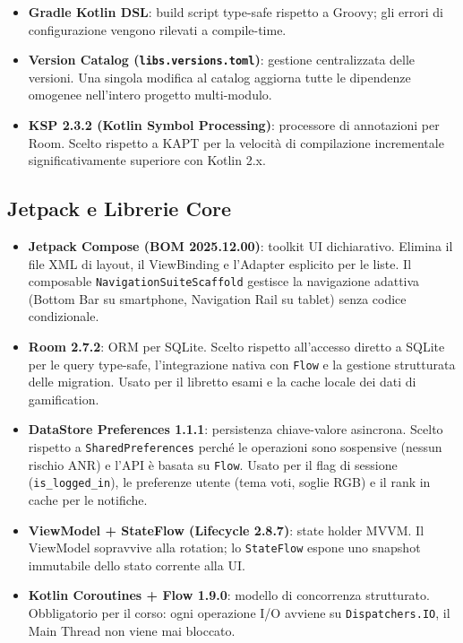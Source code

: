 \documentclass[a4paper,12pt]{report}
\begin{document}
    \begin{itemize}
        \item \textbf{Gradle Kotlin DSL}: build script type-safe rispetto a Groovy;
        gli errori di configurazione vengono rilevati a compile-time.
        \item \textbf{Version Catalog (\texttt{libs.versions.toml})}: gestione
        centralizzata delle versioni. Una singola modifica al catalog aggiorna tutte
        le dipendenze omogenee nell'intero progetto multi-modulo.
        \item \textbf{KSP 2.3.2 (Kotlin Symbol Processing)}: processore di annotazioni
        per Room. Scelto rispetto a KAPT per la velocità di compilazione incrementale
        significativamente superiore con Kotlin 2.x.
    \end{itemize}

    \subsection{Jetpack e Librerie Core}

    \begin{itemize}
        \item \textbf{Jetpack Compose (BOM 2025.12.00)}: toolkit UI dichiarativo.
        Elimina il file XML di layout, il ViewBinding e l'Adapter esplicito per le liste.
        Il composable \texttt{NavigationSuiteScaffold} gestisce la navigazione adattiva
        (Bottom Bar su smartphone, Navigation Rail su tablet) senza codice condizionale.

        \item \textbf{Room 2.7.2}: ORM per SQLite. Scelto rispetto all'accesso diretto
        a SQLite per le query type-safe, l'integrazione nativa con \texttt{Flow} e la
        gestione strutturata delle migration. Usato per il libretto esami e la cache
        locale dei dati di gamification.

        \item \textbf{DataStore Preferences 1.1.1}: persistenza chiave-valore asincrona.
        Scelto rispetto a \texttt{SharedPreferences} perché le operazioni sono sospensive
        (nessun rischio ANR) e l'API è basata su \texttt{Flow}. Usato per il flag di
        sessione (\texttt{is\_logged\_in}), le preferenze utente (tema voti, soglie RGB)
        e il rank in cache per le notifiche.

        \item \textbf{ViewModel + StateFlow (Lifecycle 2.8.7)}: state holder MVVM.
        Il ViewModel sopravvive alla rotation; lo \texttt{StateFlow} espone
        uno snapshot immutabile dello stato corrente alla UI.

        \item \textbf{Kotlin Coroutines + Flow 1.9.0}: modello di concorrenza strutturato.
        Obbligatorio per il corso: ogni operazione I/O avviene su \texttt{Dispatchers.IO},
        il Main Thread non viene mai bloccato.
    \end{itemize}
\end{document}
